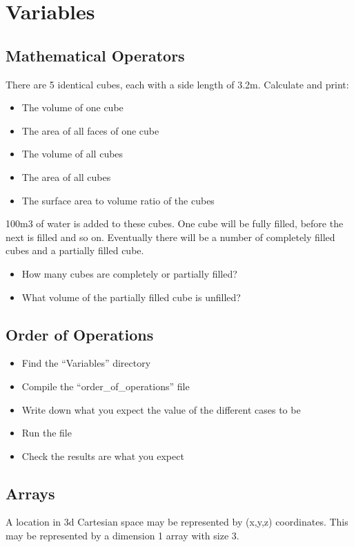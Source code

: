 \documentclass[11pt,a4paper]{article}
\begin{document}
\section{Variables}

\subsection{Mathematical Operators}
There are 5 identical cubes, each with a side length of 3.2m. Calculate and print:

\begin{itemize}
    \item The volume of one cube
    \item The area of all faces of one cube
    \item The volume of all cubes
    \item The area of all cubes
    \item The surface area to volume ratio of the cubes
\end{itemize}

100m3 of water is added to these cubes. One cube will be fully filled, before the next is filled and so on. Eventually there will be a number of completely filled cubes and a partially filled cube.

\begin{itemize}
    \item How many cubes are completely or partially filled?
    \item What volume of the partially filled cube is unfilled?
\end{itemize}


\subsection{Order of Operations}
\begin{itemize}
    \item Find the “Variables” directory
    \item Compile the “order\_of\_operations” file
    \item Write down what you expect the value of the different cases to be
    \item Run the file
    \item Check the results are what you expect
\end{itemize}

\subsection{Arrays}
A location in 3d Cartesian space may be represented by (x,y,z) coordinates. This may be represented by a dimension 1 array with size 3.
\end{document}
